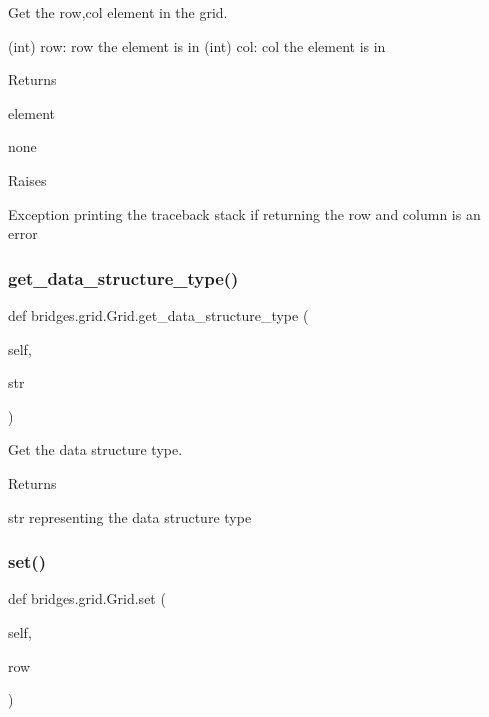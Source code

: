 Get the row,col element in the grid. 

(int) row\+: row the element is in (int) col\+: col the element is in \begin{DoxyReturn}{Returns}


element 

none 

Raises 

Exception printing the traceback stack if returning the row and column is an error 
\end{DoxyReturn}
\mbox{\label{classbridges_1_1grid_1_1_grid_ab1a040a486bbad5259fec54fb885eac1}} 
\subsubsection{\texorpdfstring{get\+\_\+data\+\_\+structure\+\_\+type()}{get\_data\_structure\_type()}}
{\footnotesize\ttfamily def bridges.\+grid.\+Grid.\+get\+\_\+data\+\_\+structure\+\_\+type (\begin{DoxyParamCaption}\item[{}]{self,  }\item[{}]{str }\end{DoxyParamCaption})}



Get the data structure type. 

\begin{DoxyReturn}{Returns}


str representing the data structure type 
\end{DoxyReturn}
\mbox{\label{classbridges_1_1grid_1_1_grid_a40d076434ad49fe29f6a931aba9f442b}} 
\subsubsection{\texorpdfstring{set()}{set()}}
{\footnotesize\ttfamily def bridges.\+grid.\+Grid.\+set (\begin{DoxyParamCaption}\item[{}]{self,  }\item[{}]{row }\end{DoxyParamCaption})}



